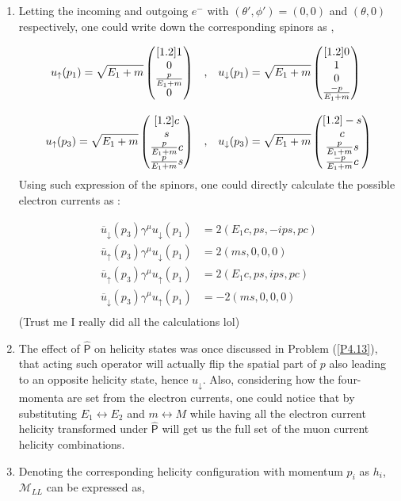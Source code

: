 \begin{solution}
\begin{enumerate}[label=(\alph*)]
        \item Letting the incoming and outgoing $e^-$ with $\left(\theta',\phi'\right)=(0,0)$ and $(\theta,0)$ respectively, one could write down the corresponding spinors as ,
        
        \begin{align*}
            u_\uparrow (p_1) = \sqrt{E_1+m} \begin{pmatrix}[1.2] 1 \\ 0 \\ \frac{p}{E_1+m} \\ 0\end{pmatrix} &\quad \text{,} \quad u_\downarrow (p_1) = \sqrt{E_1+m} \begin{pmatrix}[1.2] 0 \\ 1 \\ 0 \\ \frac{-p}{E_1+m}\end{pmatrix} \\[0.12in]
            u_\uparrow (p_3) = \sqrt{E_1+m} \begin{pmatrix}[1.2] c \\ s \\ \frac{p}{E_1+m}c \\ \frac{p}{E_1+m}s\end{pmatrix} &\quad \text{,} \quad u_\downarrow (p_3) = \sqrt{E_1+m} \begin{pmatrix}[1.2] -s \\ c \\ \frac{p}{E_1+m}s \\ \frac{-p}{E_1+m}c\end{pmatrix} \\
        \end{align*}
        Using such expression of the spinors, one could directly calculate the possible electron currents as : 

        \begin{align*}
            \overbar{u}_\downarrow(p_3)\gamma^\mu u_\downarrow(p_1) &= 2 (E_1 c , ps,-ips, pc) \\
            \overbar{u}_\uparrow(p_3)\gamma^\mu u_\downarrow(p_1)   &= 2 (ms,0,0,0) \\
            \overbar{u}_\uparrow(p_3)\gamma^\mu u_\uparrow(p_1) &= 2 (E_1 c, ps ,ips,pc) \\
            \overbar{u}_\downarrow(p_3)\gamma^\mu u_\uparrow(p_1) &= -2 (ms,0,0,0) \\
        \end{align*}
        (Trust me I really did all the calculations lol)

        \item The effect of $\hat{\mathsf{P}}$ on helicity states was once discussed in Problem (\ref{P4.13}), that acting such operator will actually flip the spatial part of $p$ also leading to an opposite helicity state, hence $u_\downarrow$. Also, considering how the four-momenta are set from the electron currents, one could notice that by substituting $E_1 \leftrightarrow E_2$ and $m \leftrightarrow M$ while having all the electron current helicity transformed under $\hat{\mathsf{P}}$ will get us the full set of the muon current helicity combinations. 

        \item Denoting the corresponding helicity configuration with momentum $p_i$ as $h_i$, $\mathcal{M}_{LL}$ can be expressed as, 


\end{enumerate}
\end{solution}
